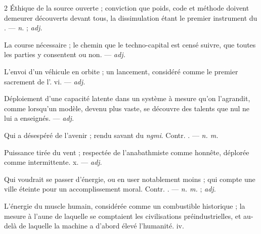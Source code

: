 \begin{multicols}{2}
 Éthique de la source ouverte ; conviction que poids, code et méthode doivent demeurer découverts devant tous, la dissimulation étant le premier instrument du .   —  \textit{n.} ;  \textit{adj.}

 La course nécessaire ; le chemin que le techno-capital est censé suivre, que toutes les parties y consentent ou non.  —  \textit{adj.}

 L'envoi d'un véhicule en orbite ; un lancement, considéré comme le premier sacrement de l'.   vi. —  \textit{adj.}

 Déploiement d'une capacité latente dans un système à mesure qu'on l'agrandit, comme lorsqu'un modèle, devenu plus vaste, se découvre des talents que nul ne lui a enseignés.  —  \textit{adj.}

 Qui a désespéré de l'avenir ; rendu savant du  \textit{ngmi}. Contr. . —  \textit{n. m.}

 Puissance tirée du vent ; respectée de l'anabathmiste comme honnête, déplorée comme intermittente.   x. —  \textit{adj.}

 Qui voudrait se passer d'énergie, ou en user notablement moins ; qui compte une ville éteinte pour un accomplissement moral. Contr. . —  \textit{n. m.} ;  \textit{adj.}

 L'énergie du muscle humain, considérée comme un combustible historique ; la mesure à l'aune de laquelle se comptaient les civilisations préindustrielles, et au-delà de laquelle la machine a d'abord élevé l'humanité.   iv.


\end{multicols}
